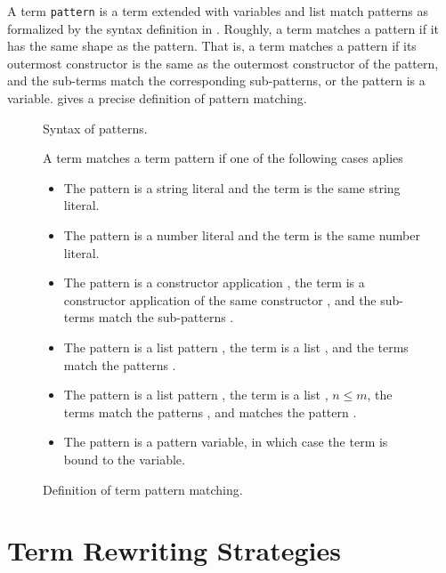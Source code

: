 A term \texttt{pattern} is a term extended with variables and list match
patterns as formalized by the syntax definition in .
Roughly, a term matches a pattern if it has the same
shape as the pattern. That is, a term matches a pattern if its outermost constructor is the
same as the outermost constructor of the pattern, and the sub-terms match the
corresponding sub-patterns, or the pattern is a variable.
 gives a precise definition of pattern matching.

\begin{figure}[p]

\caption{Syntax of patterns.}
\bigbreak
\begin{boxedminipage}{\hsize}
A term matches a term pattern if one of the following cases aplies
\begin{itemize}
  \item The pattern is a string literal and the term is the same string literal.
  \item The pattern is a number literal and the term is the same number literal.
  \item The pattern is a constructor application , the
  term is a constructor application  of the same
  constructor , and the sub-terms
   match the sub-patterns .
  \item The pattern is a list pattern \oldtexttt{[p$_1$,..,p$_n$]}, the term is a list
  \oldtexttt{[t$_1$,..,t$_n$]}, and the terms  match
  the patterns  .
  \item The pattern is a list pattern \oldtexttt{[p$_1$,..,p$_n$|p]}, the term is a list
  \oldtexttt{[t$_1$,..,t$_m$]}, $n \leq m$, the terms
   match the patterns ,
  and \oldtexttt{[t$_{m+1}$,..,t$_m$]} matches the pattern .
  \item The pattern is a pattern variable, in which case the term is bound to
  the variable.
\end{itemize}
\end{boxedminipage}
\caption{Definition of term pattern matching.}
\end{figure}


\section{Term Rewriting Strategies}

